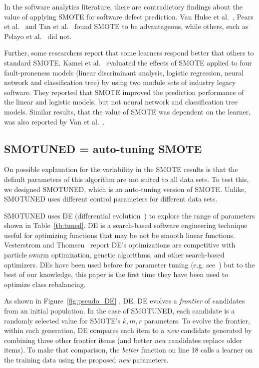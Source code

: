 \documentclass[10pt,conference]{IEEEtran}
\theoremstyle{break}
\theoremstyle{break}
\begin{document}
In the software analytics literature, there are contradictory findings about
the value of applying SMOTE for software defect prediction.
Van Hulse et al.~\cite{van2007experimental}, Pears et al.~\cite{pears2014synthetic} and Tan et al.~\cite{tan2015online} found SMOTE to be advantageous, while others, such as Pelayo et al.~\cite{pelayo2007applying} did not. 

Further, some researchers report that some learners respond better that others to standard SMOTE. Kamei et al.~\cite{kamei2007effects} evaluated the effects of SMOTE applied to  four fault-proneness models
(linear discriminant analysis, logistic regression, neural network and classification tree) by
using two module sets of industry legacy software. They reported that SMOTE improved the prediction performance of the linear and logistic models, but not neural network and classification tree models. Similar results, that the value of SMOTE was dependent on the learner,
was also reported by Van et al.~\cite{van2007experimental}.

\subsection{SMOTUNED = auto-tuning SMOTE}

On possible explanation for the variability in the SMOTE results is that the
default parameters of this algorithm are not suited to all data sets. To test this,
we designed SMOTUNED, which is an auto-tuning version of SMOTE. Unlike, SMOTUNED
uses different control parameters for different data sets.


 
SMOTUNED uses DE (differential evolution~\cite{storn1997differential}) to explore the range of parameters shown in 
Table~\ref{tb:tuned}.  DE is a search-based software engineering technique useful
for optimizing functions that may be not be smooth linear functions.   
   Vesterstrom and Thomsen~\cite{Vesterstrom04} report   DE's optimizations are  competitive with 
   particle swarm optimization, genetic algorithms, and other search-based optimizers.
   DEs have been used before for   parameter tuning (e.g. see~\cite{omran2005differential, chiha2012tuning,fu2016tuning,fu2017easy}) but to the best of our knowledge, this paper is  the first time they have been used to 
   optimize class rebalancing.



As shown in Figure~\ref{fig:pseudo_DE} , DE. 
DE evolves a \textit{frontier} of
candidates from an initial population. In the case of SMOTUNED,
each  candidate is a randomly selected value for SMOTE's $k,m,r$ parameters.
 To evolve the frontier, within each generation,
 DE compares each item to a {\em new} candidate generated
 by combining three other frontier items (and better {\em new} candidates replace
 older items). 
 To make that comparison, the {\em better} function on line 18 calls a learner on the training data using the proposed {\em new} parameters.
 
\end{document}
